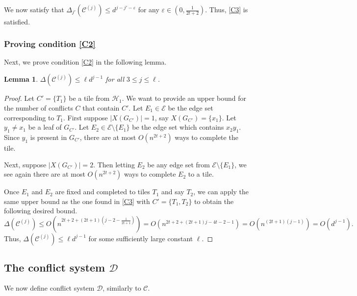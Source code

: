 \documentclass{article}
\newtheorem{lemma}[theorem]{Lemma}
\theoremstyle{definition}
\newcommand\cC{{\mathcal C}}
\newcommand{\cD}{\mathcal{D}}
\begin{document}
We now satisfy that $\Delta_{j'}(\cC^{(j)}) \leq d^{j-j'-\varepsilon}$ for any $\varepsilon\in (0,\frac{1}{2t+2})$. Thus, \ref{C3} is satisfied.



\subsubsection{Proving 
condition \ref{C2}}

Next, we prove condition \ref{C2} in the following lemma.

\begin{lemma}
$\Delta(\mathcal{C}^{(j)})\leq \ell d^{j-1}$ for all $3\leq j\leq \ell$.
\end{lemma}

\begin{proof}
Let $C' = \{T_1\}$ be a tile from $\mathcal{H}_1$. We want to provide an upper bound for the number of conflicts $C$ that contain $C'$. Let $E_1\in \mathcal{E}$ be the edge set corresponding to $T_1$. First suppose $|X(G_{C'})|=1$, say $X(G_{C'})=\{x_1\}$. Let $y_1\neq x_1$ be a leaf of $G_{C'}$. Let $E_2\in \mathcal{E}\setminus \{E_1\}$ be the edge set  which contains $x_2y_1$. Since $y_1$ is present in $G_{C'}$, there are at most $O(n^{2t+2})$ ways to complete the tile.

Next, suppose $|X(G_{C'})|=2$. Then letting $E_2$ be any edge set from $\mathcal{E}\setminus \{E_1\}$, we see again there are at most $O(n^{2t+2})$ ways to complete $E_2$ to a tile. 

Once $E_1$ and $E_2$ are fixed and completed to tiles $T_1$ and say $T_2$, we can apply the same upper bound as the one found in \ref{C3} with $C' = \{T_1,T_2\}$ to obtain the following desired bound. \[\Delta(\cC^{(j)})\leq O\left(n^{2t+2+(2t+1)(j-2-\frac{1}{2t+1})}\right) = O(n^{2t+2+(2t+1)j - 4t-2-1}) = O(n^{(2t+1)(j-1)}) = O(d^{j-1}). \] Thus, $\Delta(\mathcal{C}^{(j)})\leq \ell d^{j-1}$ for some sufficiently large constant $\ell$.
\end{proof}




\subsection{The conflict system $\cD$}\label{sec:conD}

We now define conflict system $\cD$, similarly to $\cC$.
\end{document}
